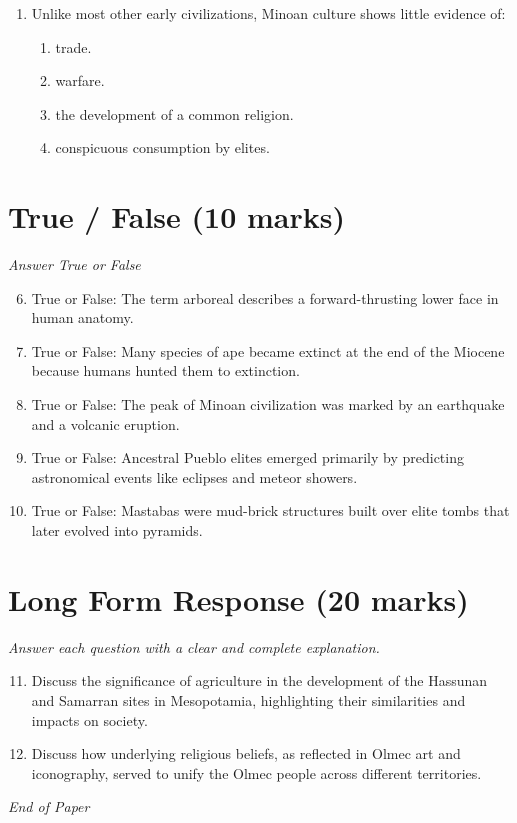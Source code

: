 \documentclass[12pt]{article}
\begin{document}
\begin{enumerate}[label=\arabic*.]
\begin{enumerate}[label=(\alph*)]
    \item requires metal and a source of heat to be forged
    \item requires many more flakes to be removed.
\end{enumerate}
\item Unlike most other early civilizations, Minoan culture shows little evidence of:
\begin{enumerate}[label=(\alph*)]
    \item trade.
    \item warfare.
    \item the development of a common religion.
    \item conspicuous consumption by elites.
\end{enumerate}
\end{enumerate}

\section*{True / False (10 marks)}
\textit{Answer True or False}
\begin{enumerate}[label=\arabic*.]
\setcounter{enumi}{5}
\item True or False: The term arboreal describes a forward-thrusting lower face in human anatomy.
\item True or False: Many species of ape became extinct at the end of the Miocene because humans hunted them to extinction.
\item True or False: The peak of Minoan civilization was marked by an earthquake and a volcanic eruption.
\item True or False: Ancestral Pueblo elites emerged primarily by predicting astronomical events like eclipses and meteor showers.
\item True or False: Mastabas were mud-brick structures built over elite tombs that later evolved into pyramids.
\end{enumerate}

\section*{Long Form Response (20 marks)}
\textit{Answer each question with a clear and complete explanation.}
\begin{enumerate}[label=\arabic*.]
\setcounter{enumi}{10}
\item Discuss the significance of agriculture in the development of the Hassunan and Samarran sites in Mesopotamia, highlighting their similarities and impacts on society.
\item Discuss how underlying religious beliefs, as reflected in Olmec art and iconography, served to unify the Olmec people across different territories.
\end{enumerate}

\vfill
\noindent\textit{End of Paper}
\end{document}
